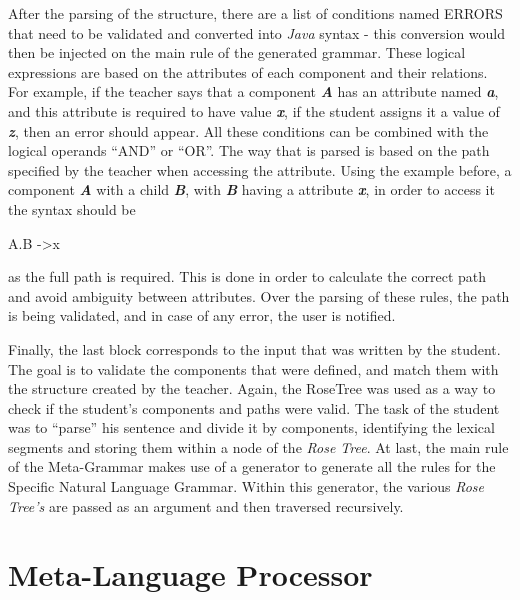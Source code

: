 After the parsing of the structure, there are a list of conditions named ERRORS that need to be validated and converted into \emph{Java} syntax - this conversion would then be injected on the main rule of the generated grammar. These logical expressions are based on the attributes of each component and their relations. For example, if the teacher says that a component \emph{\textbf{A}} has an attribute named \emph{\textbf{a}}, and this attribute is required to have value \emph{\textbf{x}}, if the student assigns it a value of \emph{\textbf{z}}, then an error should appear. All these conditions can be combined with the logical operands ``AND'' or ``OR''. The way that is parsed is based on the path specified by the teacher when accessing the attribute. Using the example before, a component \emph{\textbf{A}} with a child \emph{\textbf{B}}, with \emph{\textbf{B}} having a attribute \emph{\textbf{x}}, in order to access it the syntax should be

A.B -\textgreater x

\noindent as the full path is required. This is done in order to calculate the correct path and avoid ambiguity between attributes. Over the parsing of these rules, the path is being validated, and in case of any error, the user is notified.

Finally, the last block corresponds to the input that was written by the student. 
The goal is to validate the components that were defined, and match them with the structure created by the teacher. 
Again, the RoseTree was used as a way to check if the student’s components and paths were valid. 
The task of the student was to ``parse'' his sentence and divide it by components, identifying the lexical segments and storing them within a node of the \emph{Rose Tree}. 
At last, the main rule of the Meta-Grammar makes use of a generator to generate all the rules for the Specific Natural Language Grammar. 
Within this generator, the various \emph{Rose Tree's} are passed as an argument and then traversed recursively.

\section{Meta-Language Processor}


